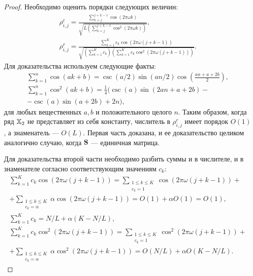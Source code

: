 \documentclass[12pt,a4paper,fleqn,leqno]{article}
\begin{document}
\begin{proof}
Необходимо оценить порядки следующих величин:
\begin{gather*}
\rho^c_{i,j} = \frac{\sum_{k=j}^{j + L - 1} \cos(2 \pi \omega k)}{\sqrt{L (\sum_{k=j}^{j + L - 1} \cos^2(2 \pi \omega k))}},\\ \rho^r_{i,j} = \frac{\sum_{k=1}^K c_k\cos(2 \pi \omega (j + k - 1))}{\sqrt{(\sum_{k=1}^K c_k) (\sum_{k=1}^K c_k\cos^2(2 \pi \omega (j + k - 1)))}}.
\end{gather*}
Для доказательства используем следующие факты:
\begin{gather*}
\sum_{k=1}^n \cos(ak + b) = \csc(a/2) \sin(an / 2) \cos \left(\frac{an + a + 2b}{2} \right), \\
\sum_{k=1}^n \cos^2(ak + b) = \frac{1}{4}(\csc(a) \sin(2an + a + 2b) -\\ - \csc(a)\sin(a + 2b) + 2n),
\end{gather*}
для любых вещественных $a, b$ и положительного целого $n$.
Таким образом, когда ряд $\mathbb{X}_2$ не представляет из себя константу, числитель в $\rho^c_{i,j}$ имеет порядок $O(1)$, а знаменатель --- $O(L)$.
Первая часть доказана, и ее доказательство целиком аналогично случаю, когда $\mathbf{S}$ --- единичная матрица.

Для доказательства второй части необходимо разбить суммы и в числителе, и в знаменателе согласно соответствующим значениям $c_k$:
\begin{gather*}
\sum_{k=1}^K c_k\cos(2 \pi \omega (j + k - 1)) = \sum_{\substack{1 \le k \le K \\ c_k = 1}}\cos(2 \pi \omega (j + k - 1)) +\\ +\sum_{\substack{1 \le k \le K \\ c_k = \alpha}}\alpha \cos(2 \pi \omega (j + k - 1)) = O(1) + \alpha O(1) = O(1),
\\
\sum_{k=1}^K c_k = N/L + \alpha(K - N/L),
\\
\sum_{k=1}^K c_k\cos^2(2 \pi \omega (j + k - 1)) = \sum_{\substack{1 \le k \le K \\ c_k = 1}}\cos^2(2 \pi \omega (j + k - 1)) +\\ +\sum_{\substack{1 \le k \le K \\ c_k = \alpha}}\alpha \cos^2(2 \pi \omega (j + k - 1)) = O(N/L) + \alpha O(K - N/L).
\end{gather*}
\end{proof}
\end{document}
